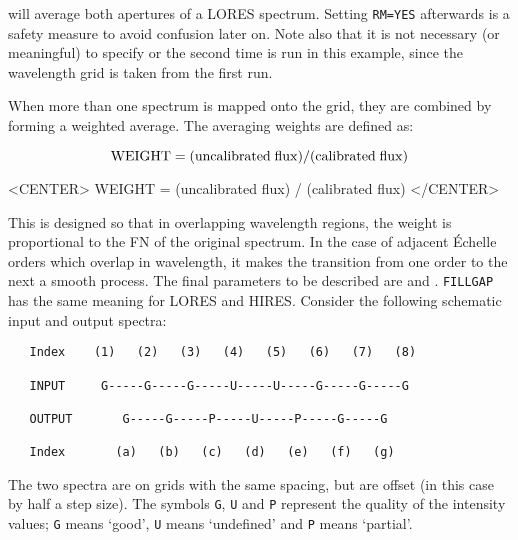will average both apertures of a LORES spectrum.  Setting \verb+RM=YES+
afterwards is a safety measure to avoid confusion later on.  Note also that it
is not necessary (or meaningful) to specify 
 or 
 the
second time 
 is run in this example, since the wavelength grid is
taken from the first run.

When more than one spectrum is mapped onto the grid, they are combined by
forming a weighted average.  The averaging weights are defined as:

\begin{latexonly}
\begin{displaymath}
   {\rm WEIGHT} = ({\rm uncalibrated\; flux}) / ({\rm calibrated\; flux})
\end{displaymath}
\end{latexonly}

\begin{htmlonly}
\begin{rawhtml}
<CENTER>
WEIGHT = (uncalibrated flux) / (calibrated flux)
</CENTER>
\end{rawhtml}
\end{htmlonly}

This is designed so that in overlapping wavelength regions, the weight is
proportional to the FN of the original spectrum.  In the case of adjacent
\'{E}chelle orders which overlap in wavelength, it makes the transition from one
order to the next a smooth process.  The final parameters to be described
are  and
\@.  \verb+FILLGAP+ has the same meaning
for LORES and HIRES\@.  Consider the following schematic input and output
spectra:

\begin{verbatim}
   Index    (1)   (2)   (3)   (4)   (5)   (6)   (7)   (8)

   INPUT     G-----G-----G-----U-----U-----G-----G-----G

   OUTPUT       G-----G-----P-----U-----P-----G-----G

   Index       (a)   (b)   (c)   (d)   (e)   (f)   (g)
\end{verbatim}

The two spectra are on grids with the same spacing, but are offset (in this
case by half a step size)\@.  The symbols \verb+G+, \verb+U+ and \verb+P+
represent the quality of the intensity values; \verb+G+ means `good', \verb+U+
means `undefined' and \verb+P+ means `partial'\@.

